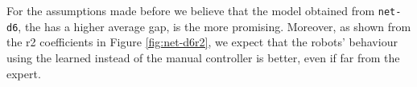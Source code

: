 For the assumptions made before we believe that the model obtained from  
\texttt{net-d6}, the has a higher average gap, is the more promising. 
Moreover, as shown from the \gls{r2} coefficients in Figure \ref{fig:net-d6r2}, we 
expect that the robots’ behaviour using the learned instead of the manual 
controller is better, even if far from the expert.


%			
%			
%			
